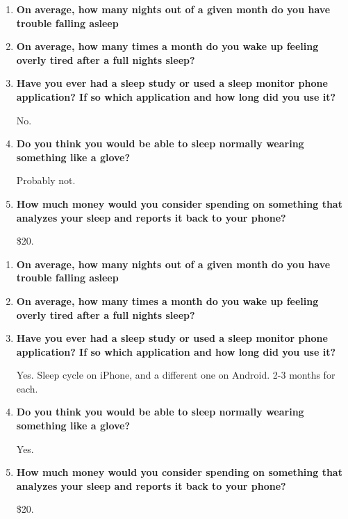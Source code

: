 \documentclass[finalProposal.tex]{subfiles}
\begin{document}
\bigskip

\begin{enumerate}
    \item {\bf{On average, how many nights out of a given month do you have trouble falling asleep}}

\smallskip
    \item {\bf{On average, how many times a month do you wake up feeling overly tired after a full nights sleep?}}

\smallskip
    \item {\bf{Have you ever had a sleep study or used a sleep monitor phone application? If so which application and how long did you use it?}}

\smallskip
No.
\smallskip
    \item {\bf{Do you think you would be able to sleep normally wearing something like a glove?}}

\smallskip
Probably not.
\smallskip
    \item {\bf{How much money would you consider spending on something that analyzes your sleep and reports it back to your phone?}}

\smallskip
\$20.
\smallskip
\end{enumerate}

\bigskip

\begin{enumerate}
    \item {\bf{On average, how many nights out of a given month do you have trouble falling asleep}}

\smallskip
    \item {\bf{On average, how many times a month do you wake up feeling overly tired after a full nights sleep?}}

\smallskip
    \item {\bf{Have you ever had a sleep study or used a sleep monitor phone application? If so which application and how long did you use it?}}

\smallskip
Yes. Sleep cycle on iPhone, and a different one on Android. 2-3 months for each.
\smallskip
    \item {\bf{Do you think you would be able to sleep normally wearing something like a glove?}}

\smallskip
Yes.
\smallskip
    \item {\bf{How much money would you consider spending on something that analyzes your sleep and reports it back to your phone?}}

\smallskip
\$20.
\smallskip
\end{enumerate}
\end{document}
